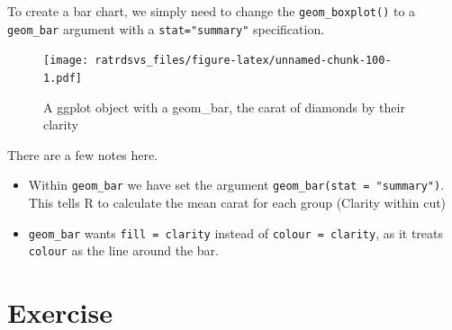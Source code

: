 \documentclass[
]{book}
\newenvironment{Shaded}{\begin{snugshade}}{\end{snugshade}}
\newcommand{\DataTypeTok}[1]{\textcolor[rgb]{0.13,0.29,0.53}{#1}}
\newcommand{\KeywordTok}[1]{\textcolor[rgb]{0.13,0.29,0.53}{\textbf{#1}}}
\newcommand{\NormalTok}[1]{#1}
\newcommand{\OperatorTok}[1]{\textcolor[rgb]{0.81,0.36,0.00}{\textbf{#1}}}
\newcommand{\StringTok}[1]{\textcolor[rgb]{0.31,0.60,0.02}{#1}}
\begin{document}
To create a bar chart, we simply need to change the \texttt{geom\_boxplot()} to a \texttt{geom\_bar} argument with a \texttt{stat="summary"} specification.

\begin{Shaded}
\end{Shaded}

\begin{figure}
\centering
\texttt{[image: ratrdsvs\_files/figure-latex/unnamed-chunk-100-1.pdf]}
\caption{\label{fig:unnamed-chunk-100}A ggplot object with a geom\_bar, the carat of diamonds by their clarity}
\end{figure}

There are a few notes here.

\begin{itemize}
\item
  Within \texttt{geom\_bar} we have set the argument \texttt{geom\_bar(stat\ =\ "summary")}. This tells R to calculate the mean carat for each group (Clarity within cut)
\item
  \texttt{geom\_bar} wants \texttt{fill\ =\ clarity} instead of \texttt{colour\ =\ clarity}, as it treats \texttt{colour} as the line around the bar.
\end{itemize}

\hypertarget{ex_ggplot}{%
\section{Exercise}\label{ex_ggplot}}
\end{document}
